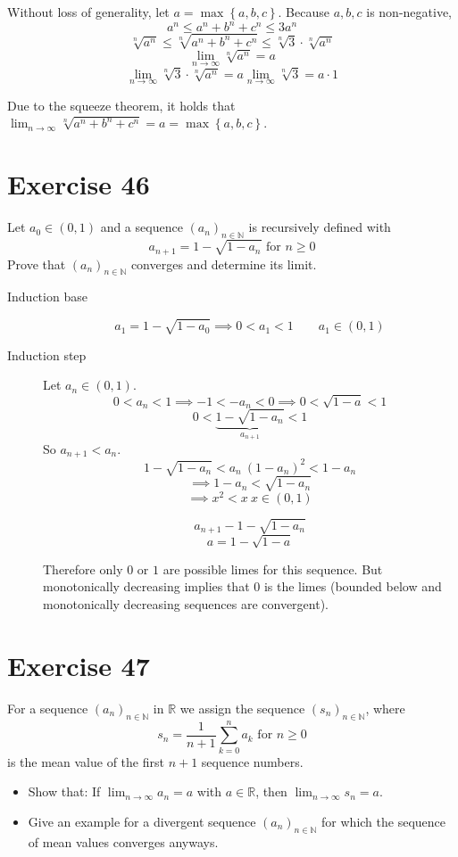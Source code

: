 \documentclass[a4paper]{article}
\theoremstyle{definition}
\newcommand\set[1]{\left\{#1\right\}}
\begin{document}
Without loss of generality, let $a = \max\set{a,b,c}$. Because $a,b,c$ is non-negative,
\[ a^n \leq a^n + b^n + c^n \leq 3a^n \]
\[ \sqrt[n]{a^n} \leq \sqrt[n]{a^n + b^n + c^n} \leq \sqrt[n]{3} \cdot \sqrt[n]{a^n} \]
\[ \lim_{n\to\infty} \sqrt[n]{a^n} = a \]
\[ \lim_{n\to\infty} \sqrt[n]{3} \cdot \sqrt[n]{a^n} = a \lim_{n\to\infty} \sqrt[n]{3} = a \cdot 1 \]

Due to the squeeze theorem, it holds that $\lim_{n\to\infty} \sqrt[n]{a^n + b^n + c^n} = a = \max\set{a,b,c}$.

\section{Exercise 46}
\begin{ex}
  Let $a_0 \in (0, 1)$ and a sequence $(a_n)_{n\in\mathbb N}$ is recursively defined with
  \[ a_{n+1} = 1 - \sqrt{1 - a_n} \text{ for } n \geq 0 \]
  Prove that $(a_n)_{n \in \mathbb N}$ converges and determine its limit.
\end{ex}

\begin{description}
  \item[Induction base]
    \[ a_1 = 1 - \sqrt{1 - a_0} \implies 0 < a_1 < 1 \qquad a_1 \in (0, 1) \]
  \item[Induction step]
    Let $a_n \in (0, 1)$.
    \[ 0 < a_n < 1 \implies -1 < -a_n < 0 \implies 0 < \sqrt{1 - a} < 1 \]
    \[ 0 < \underbrace{1 - \sqrt{1 - a_n}}_{a_{n+1}} < 1 \]
    So $a_{n+1} < a_n$.
    \[ 1 - \sqrt{1 - a_n} < a_n \ (1 - a_n)^2 < 1 - a_n \]
    \[ \implies 1 - a_n < \sqrt{1 - a_n} \]
    \[ \implies x^2 < x \ x \in (0, 1) \]

    \[ a_{n+1} - 1 - \sqrt{1 - a_n} \]
    \[ a = 1 - \sqrt{1 - a} \]

    Therefore only $0$ or $1$ are possible limes for this sequence.
    But monotonically decreasing implies that $0$ is the limes
    (bounded below and monotonically decreasing sequences are convergent).
\end{description}

\section{Exercise 47}
\begin{ex}
  For a sequence $\left(a_n\right)_{n\in\mathbb N}$ in $\mathbb R$ we assign the sequence $\left(s_n\right)_{n\in\mathbb N}$, where
  \[ s_n = \frac{1}{n+1} \sum_{k=0}^n a_k \text{ for } n \geq 0 \]
  is the mean value of the first $n+1$ sequence numbers.
  \begin{itemize}
    \item Show that: If $\lim_{n\to\infty} a_n = a$ with $a \in \mathbb R$, then $\lim_{n\to\infty} s_n = a$.
    \item Give an example for a divergent sequence $\left(a_n\right)_{n \in \mathbb N}$ for which the sequence of mean values converges anyways.
  \end{itemize}
\end{ex}
\end{document}
